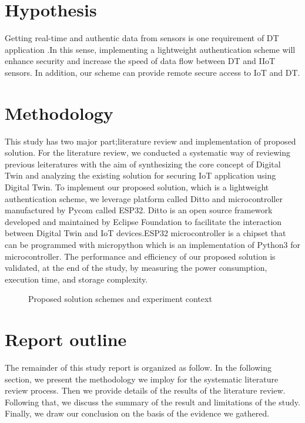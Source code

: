 \section{Hypothesis}
Getting real-time and authentic data from sensors is one requirement of DT application \cite{yuchenziqianzhangningtangApplicationDigitalTwin2022}.In this sense, implementing a lightweight authentication scheme will enhance security and increase the speed of data flow between DT and IIoT sensors. In addition, our scheme can provide remote secure access to IoT and DT.  


\section{Methodology}
This study has two major part;literature review and implementation of proposed solution. For the literature review, we conducted a systematic way of reviewing previous leiteratures with the aim of synthesizing the core concept of Digital Twin and analyzing the existing solution for securing IoT application using Digital Twin. To implement our proposed solution, which is a lightweight authentication scheme, we leverage platform called Ditto and microcontroller manufactured by Pycom called ESP32. Ditto is an open source framework developed and maintained by Eclipse Foundation to facilitate the interaction between Digital Twin and IoT devices\cite{noauthor_eclipse_nodate}.ESP32 microcontroller is a chipset that can be programmed with micropython which is an implementation of Python3 for microcontroller. 
The performance and efficiency of our proposed solution is validated, at the end of the study, by measuring the power consumption, execution time, and storage complexity. 

\begin{figure}[H]
    \centering
    
    \caption{Proposed solution schemes and experiment context}
    \label{fig:ps-scheme}
\end{figure}

\section{Report outline}
The remainder of this study report is organized as follow. In the following section, we present the methodology we imploy for the systematic literature review process. Then we provide details of the results of the literature review. Following that, we discuss the summary of the result and limitations of the study. Finally, we draw our conclusion on the basis of the evidence we gathered.   

